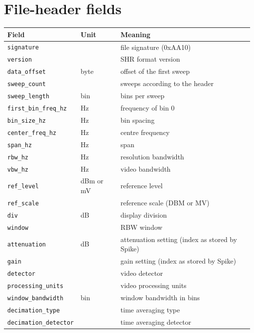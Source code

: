 \documentclass[11pt,a4paper]{article}
\begin{document}
\section{File-header fields}
\begin{longtable}{p{4.4cm}p{2.2cm}p{8.6cm}}
\toprule
\textbf{Field} & \textbf{Unit} & \textbf{Meaning}\\
\midrule
\endhead
\texttt{signature} &  & file signature (0xAA10)\\
\texttt{version} &  & SHR format version\\
\texttt{data\_\allowbreak{}offset} & byte & offset of the first sweep\\
\texttt{sweep\_\allowbreak{}count} &  & sweeps according to the header\\
\texttt{sweep\_\allowbreak{}length} & bin & bins per sweep\\
\texttt{first\_\allowbreak{}bin\_\allowbreak{}freq\_\allowbreak{}hz} & Hz & frequency of bin 0\\
\texttt{bin\_\allowbreak{}size\_\allowbreak{}hz} & Hz & bin spacing\\
\texttt{center\_\allowbreak{}freq\_\allowbreak{}hz} & Hz & centre frequency\\
\texttt{span\_\allowbreak{}hz} & Hz & span\\
\texttt{rbw\_\allowbreak{}hz} & Hz & resolution bandwidth\\
\texttt{vbw\_\allowbreak{}hz} & Hz & video bandwidth\\
\texttt{ref\_\allowbreak{}level} & dBm or mV & reference level\\
\texttt{ref\_\allowbreak{}scale} &  & reference scale (DBM or MV)\\
\texttt{div} & dB & display division\\
\texttt{window} &  & RBW window\\
\texttt{attenuation} & dB & attenuation setting (index as stored by Spike)\\
\texttt{gain} &  & gain setting (index as stored by Spike)\\
\texttt{detector} &  & video detector\\
\texttt{processing\_\allowbreak{}units} &  & video processing units\\
\texttt{window\_\allowbreak{}bandwidth} & bin & window bandwidth in bins\\
\texttt{decimation\_\allowbreak{}type} &  & time averaging type\\
\texttt{decimation\_\allowbreak{}detector} &  & time averaging detector\\

\end{longtable}
\end{document}
